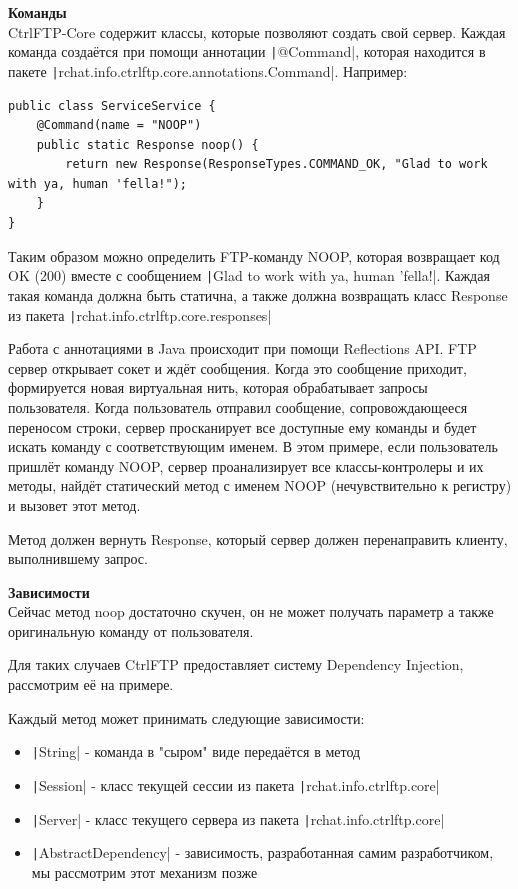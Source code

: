 \documentclass[a4paper,14pt]{extarticle}
\begin{document}
\textbf{Команды}\\

CtrlFTP-Core содержит классы, которые позволяют создать свой сервер. Каждая команда создаётся
при помощи аннотации \texttt|@Command|, которая находится в пакете \texttt|rchat.info.ctrlftp.core.annotations.Command|.
Например:
\begin{verbatim}
public class ServiceService {
    @Command(name = "NOOP")
    public static Response noop() {
        return new Response(ResponseTypes.COMMAND_OK, "Glad to work with ya, human 'fella!");
    }
}
\end{verbatim}

Таким образом можно определить FTP-команду NOOP, которая возвращает код OK (200) вместе с сообщением
\texttt|Glad to work with ya, human 'fella!|. Каждая такая команда должна быть статична, а также 
должна возвращать класс Response из пакета \texttt|rchat.info.ctrlftp.core.responses|

Работа с аннотациями в Java происходит при помощи Reflections API. FTP сервер открывает сокет и ждёт сообщения.
Когда это сообщение приходит, формируется новая виртуальная нить, которая обрабатывает запросы пользователя. 
Когда пользователь отправил сообщение, сопровождающееся переносом строки, сервер просканирует все доступные 
ему команды и будет искать команду с соответствующим именем. В этом примере, если пользователь пришлёт
команду NOOP, сервер проанализирует все классы-контролеры и их методы, найдёт статический метод 
с именем NOOP (нечувствительно к регистру) и вызовет этот метод. 

Метод должен вернуть Response, который сервер должен перенаправить клиенту, выполнившему запрос.

\textbf{Зависимости}\\
Сейчас метод noop достаточно скучен, он не может получать параметр а также оригинальную команду от пользователя.

Для таких случаев CtrlFTP предоставляет систему Dependency Injection, рассмотрим её на примере.

Каждый метод может принимать следующие зависимости:
\begin{itemize}
  \item \texttt|String| - команда в "сыром" виде передаётся в метод 
  \item \texttt|Session| - класс текущей сессии из пакета \texttt|rchat.info.ctrlftp.core|
  \item \texttt|Server| - класс текущего сервера из пакета \texttt|rchat.info.ctrlftp.core|
  \item \texttt|AbstractDependency| - зависимость, разработанная самим разработчиком, мы рассмотрим этот механизм позже
\end{itemize}
\end{document}

